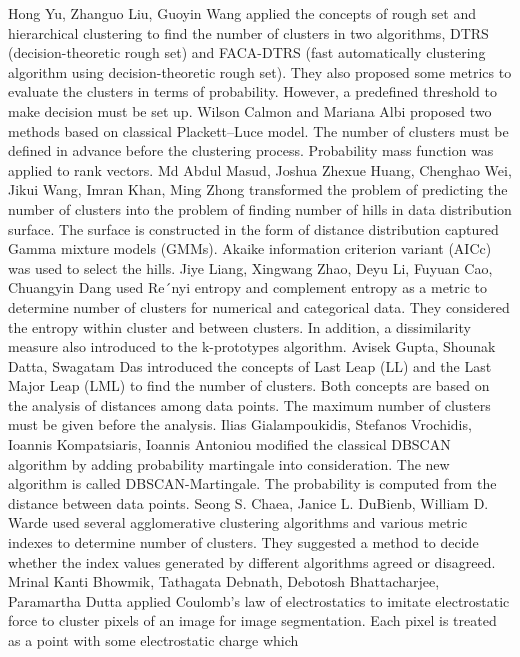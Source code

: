 \documentclass[lettersize,journal]{IEEEtran}
\begin{document}
Hong Yu, Zhanguo Liu, Guoyin Wang \cite{Hong} applied the concepts of rough set and hierarchical clustering 
to find the number of clusters in two algorithms, DTRS (decision-theoretic rough set) and FACA-DTRS
(fast automatically clustering algorithm using
decision-theoretic rough set). They also proposed some metrics to evaluate the clusters in terms
of probability. However, a predefined threshold to make decision must be set up.
Wilson Calmon and Mariana Albi \cite{Calmon} proposed two methods based on classical Plackett–Luce model.
The number of clusters must be defined in advance before the clustering process. Probability mass function 
was applied to rank vectors.
Md Abdul Masud, Joshua Zhexue Huang, Chenghao Wei, Jikui Wang, Imran Khan, Ming Zhong \cite{Abdul}
transformed the problem of predicting the number of clusters into the problem of finding number of hills
in data distribution surface. The surface is constructed in the form of distance distribution captured
Gamma mixture models (GMMs). Akaike information criterion variant (AICc) was used to select the hills.
Jiye Liang, Xingwang Zhao, Deyu Li, Fuyuan Cao, Chuangyin Dang \cite{Liang} used Re´nyi entropy and 
complement entropy as a metric to determine number of clusters for numerical and categorical data. 
They considered the entropy within cluster and between clusters. In addition, a dissimilarity measure 
also introduced to the k-prototypes algorithm.
Avisek Gupta, Shounak Datta, Swagatam Das \cite{Gupta} introduced the concepts of Last Leap (LL) and 
the Last Major Leap (LML) to find the number of clusters. Both concepts are based on the analysis of 
distances among data points. The maximum number of clusters must be given before the analysis. 
Ilias Gialampoukidis, Stefanos Vrochidis, Ioannis Kompatsiaris, Ioannis Antoniou \cite{Gialampoukidis}
modified the classical DBSCAN algorithm by adding probability martingale into consideration. The new 
algorithm is called DBSCAN-Martingale. The probability is computed from the distance between data points. 
Seong S. Chaea, Janice L. DuBienb, William D. Warde \cite{Chaea} used several agglomerative clustering 
algorithms and various metric indexes to determine number of clusters. They suggested a method to
decide whether the index values generated by different algorithms agreed or disagreed.
Mrinal Kanti Bhowmik, Tathagata Debnath, Debotosh Bhattacharjee, Paramartha Dutta \cite{Bhowmik}
applied Coulomb's law of electrostatics to imitate electrostatic force to cluster pixels of 
an image for image segmentation. Each pixel is treated as a point with some electrostatic charge which 
\end{document}
